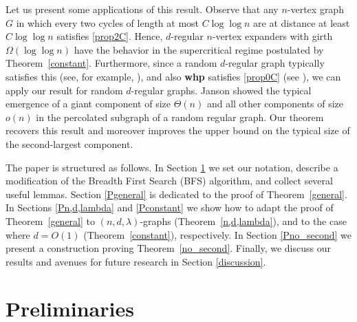 \documentclass[notitlepage]{scrartcl}
\begin{document}
Let us present some applications of this result. Observe that any $n$-vertex graph $G$ in which every two cycles of length at most $C\log\log n$ are at distance at least $C\log\log n$ satisfies \ref{prop2C}. Hence, $d$-regular $n$-vertex expanders with girth $\Omega(\log\log n)$ have the behavior in the supercritical regime postulated by Theorem~\ref{constant}. Furthermore, since a random $d$-regular graph typically satisfies this (see, for example, \cite{zbMATH01342092}), and also \textbf{whp} satisfies \ref{prop0C} (see \cite{zbMATH04101270}), we can apply our result for random $d$-regular graphs. Janson \cite{zbMATH05636576} showed the typical emergence of a giant component of size $\Theta(n)$ and all other components of size $o(n)$ in the percolated subgraph of a random regular graph. Our theorem recovers this result and moreover improves the upper bound on the typical size of the second-largest component.

The paper is structured as follows. In Section \ref{pre} we set our notation, describe a modification of the Breadth First Search (BFS) algorithm, and collect several useful lemmas. Section \ref{Pgeneral} is dedicated to the proof of Theorem~\ref{general}. In Sections \ref{Pn,d,lambda} and \ref{Pconstant} we show how to adapt the proof of Theorem~\ref{general} to $(n,d,\lambda)$-graphs (Theorem~\ref{n,d,lambda}), and to the case where $d=O(1)$ (Theorem~\ref{constant}), respectively. In Section \ref{Pno_second} we present a construction proving Theorem~\ref{no_second}. Finally, we discuss our results and avenues for future research in Section \ref{discussion}.

\section{Preliminaries} \label{pre}
\end{document}

